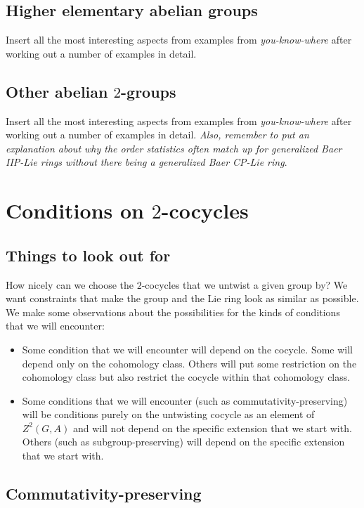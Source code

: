 \documentclass[10pt]{amsart}
\begin{document}
\subsection{Higher elementary abelian groups}

Insert all the most interesting aspects from examples from {\em
you-know-where} after working out a number of examples in detail.

\subsection{Other abelian $2$-groups}

Insert all the most interesting aspects from examples from {\em
you-know-where} after working out a number of examples in detail. {\em
Also, remember to put an explanation about why the order statistics
often match up for generalized Baer IIP-Lie rings without there being
a generalized Baer CP-Lie ring}.

\section{Conditions on $2$-cocycles}

\subsection{Things to look out for}

How nicely can we choose the $2$-cocycles that we untwist a given group
by? We want constraints that make the group and the Lie ring look as
similar as possible. We make some observations about the possibilities
for the kinds of conditions that we will encounter:

\begin{itemize}
\item Some condition that we will encounter will depend on the
  cocycle. Some will depend only on the cohomology class. Others will
  put some restriction on the cohomology class but also restrict the
  cocycle within that cohomology class.
\item Some conditions that we will encounter (such as
  commutativity-preserving) will be conditions purely on the
  untwisting cocycle as an element of $Z^2(G,A)$ and will not depend
  on the specific extension that we start with. Others (such as
  subgroup-preserving) will depend on the specific extension that we
  start with.
\end{itemize}

\subsection{Commutativity-preserving}
\end{document}
